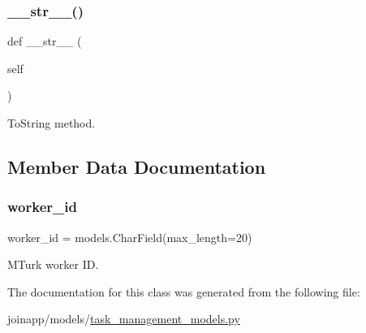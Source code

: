 \subsubsection{\texorpdfstring{\_\_str\_\_()}{\_\_str\_\_()}}
{\footnotesize\ttfamily def \+\_\+\+\_\+str\+\_\+\+\_\+ (\begin{DoxyParamCaption}\item[{}]{self }\end{DoxyParamCaption})}



To\+String method. 



\subsection{Member Data Documentation}
\mbox{\label{classjoinapp_1_1models_1_1task__management__models_1_1_worker_adaca9ae6354c32a7ed391518a2299f0f}} 
\subsubsection{\texorpdfstring{worker\_id}{worker\_id}}
{\footnotesize\ttfamily worker\+\_\+id = models.\+Char\+Field(max\+\_\+length=20)\hspace{0.3cm}{\ttfamily [static]}}



M\+Turk worker ID. 



The documentation for this class was generated from the following file\+:\begin{DoxyCompactItemize}
\item 
joinapp/models/\mbox{\hyperlink{task__management__models_8py}{task\+\_\+management\+\_\+models.\+py}}\end{DoxyCompactItemize}
